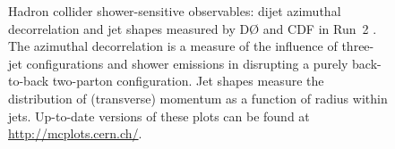 \begin{figure}[tp]
  \centering
  \caption{Hadron collider shower-sensitive observables: dijet azimuthal
    decorrelation and jet shapes measured by D\O{} and CDF in Run~2 \cite{Abazov:2004hm,Acosta:2005ix}.
    The azimuthal decorrelation is a measure of
    the influence of three-jet configurations and shower emissions in disrupting
    a purely back-to-back two-parton configuration. Jet shapes measure the
    distribution of (transverse) momentum as a function of radius within jets.
    Up-to-date versions of these plots can be found at
    \url{http://mcplots.cern.ch/}.}
  \label{fig:cmp:ppshapes}
\end{figure}

